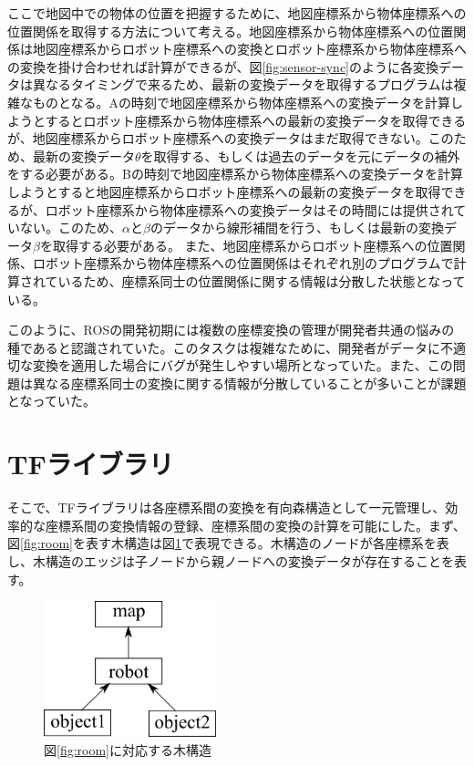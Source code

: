 \documentclass[a4paper]{jreport}	%
\begin{document}
ここで地図中での物体の位置を把握するために、地図座標系から物体座標系への位置関係を取得する方法について考える。地図座標系から物体座標系への位置関係は地図座標系からロボット座標系への変換とロボット座標系から物体座標系への変換を掛け合わせれば計算ができるが、図\ref{fig:sensor-sync}のように各変換データは異なるタイミングで来るため、最新の変換データを取得するプログラムは複雑なものとなる。Aの時刻で地図座標系から物体座標系への変換データを計算しようとするとロボット座標系から物体座標系への最新の変換データを取得できるが、地図座標系からロボット座標系への変換データはまだ取得できない。このため、最新の変換データ$\theta$を取得する、もしくは過去のデータを元にデータの補外をする必要がある。Bの時刻で地図座標系から物体座標系への変換データを計算しようとすると地図座標系からロボット座標系への最新の変換データを取得できるが、ロボット座標系から物体座標系への変換データはその時間には提供されていない。このため、$\alpha$と$\beta$のデータから線形補間を行う、もしくは最新の変換データ$\beta$を取得する必要がある。
また、地図座標系からロボット座標系への位置関係、ロボット座標系から物体座標系への位置関係はそれぞれ別のプログラムで計算されているため、座標系同士の位置関係に関する情報は分散した状態となっている。


このように、ROSの開発初期には複数の座標変換の管理が開発者共通の悩みの種であると認識されていた。このタスクは複雑なために、開発者がデータに不適切な変換を適用した場合にバグが発生しやすい場所となっていた。また、この問題は異なる座標系同士の変換に関する情報が分散していることが多いことが課題となっていた。

\section{TFライブラリ}
\label{section:intro-tf}

そこで、TFライブラリは各座標系間の変換を有向森構造として一元管理し、効率的な座標系間の変換情報の登録、座標系間の変換の計算を可能にした。まず、図\ref{fig:room}を表す木構造は図\ref{fig:room-tree}で表現できる。木構造のノードが各座標系を表し、木構造のエッジは子ノードから親ノードへの変換データが存在することを表す。

\begin{figure}[h] 
\centering
\includegraphics[width=5cm]{tree}	
\caption{図\ref{fig:room}に対応する木構造}
\label{fig:room-tree}
\end{figure}
\end{document}
